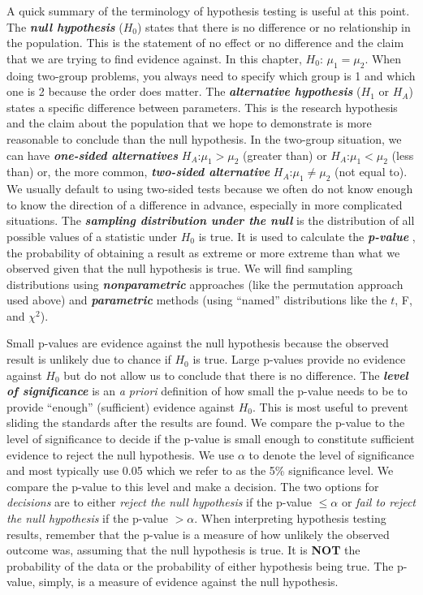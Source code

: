 \documentclass[]{book}
\theoremstyle{definition}
\theoremstyle{definition}
\theoremstyle{remark}
\begin{document}
A quick summary of the terminology of hypothesis testing is useful at
this point. The \textbf{\emph{null hypothesis}} (\(H_0\)) states that
there is no difference or no relationship in the population. This is the
statement of no effect or no difference and the claim that we are trying
to find evidence against. In this chapter, \(H_0\): \(\mu_1=\mu_2\).
When doing two-group problems, you always need to specify which group is
1 and which one is 2 because the order does matter. The
\textbf{\emph{alternative hypothesis}} (\(H_1\) or \(H_A\)) states a
specific difference between parameters. This is the research hypothesis
and the claim about the population that we hope to demonstrate is more
reasonable to conclude than the null hypothesis. In the two-group
situation, we can have \textbf{\emph{one-sided alternatives}}
\(H_A\):\(\mu_1 > \mu_2\) (greater than) or \(H_A\):\(\mu_1 < \mu_2\)
(less than) or, the more common, \textbf{\emph{two-sided alternative}}
\(H_A\):\(\mu_1 \ne \mu_2\) (not equal to). We usually default to using
two-sided tests because we often do not know enough to know the
direction of a difference in advance, especially in more complicated
situations. The \textbf{\emph{sampling distribution under the null}} is
the distribution of all possible values of a statistic under \(H_0\) is
true. It is used to calculate the \textbf{\emph{p-value}} , the
probability of obtaining a result as extreme or more extreme than what
we observed given that the null hypothesis is true. We will find
sampling distributions using \textbf{\emph{nonparametric}} approaches
(like the permutation approach used above) and
\textbf{\emph{parametric}} methods (using ``named'' distributions like
the \(t\), F, and \(\chi^2\)).

Small p-values are evidence against the null hypothesis because the
observed result is unlikely due to chance if \(H_0\) is true. Large
p-values provide no evidence against \(H_0\) but do not allow us to
conclude that there is no difference. The \textbf{\emph{level of
significance}} is an \emph{a priori} definition of how small the p-value
needs to be to provide ``enough'' (sufficient) evidence against \(H_0\).
This is most useful to prevent sliding the standards after the results
are found. We compare the p-value to the level of significance to decide
if the p-value is small enough to constitute sufficient evidence to
reject the null hypothesis. We use \(\alpha\) to denote the level of
significance and most typically use 0.05 which we refer to as the 5\%
significance level. We compare the p-value to this level and make a
decision. The two options for \emph{decisions} are to either
\emph{reject the null hypothesis} if the p-value \(\le \alpha\) or
\emph{fail to reject the null hypothesis} if the p-value \(> \alpha\).
When interpreting hypothesis testing results, remember that the p-value
is a measure of how unlikely the observed outcome was, assuming that the
null hypothesis is true. It is \textbf{NOT} the probability of the data
or the probability of either hypothesis being true. The p-value, simply,
is a measure of evidence against the null hypothesis.
\end{document}
